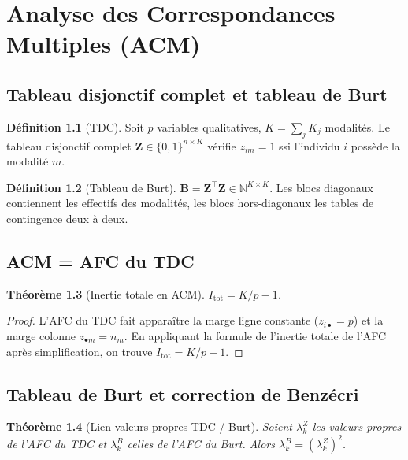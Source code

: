 \documentclass[11pt, a4paper, openany]{book}
\theoremstyle{plain}
\newtheorem{theorem}{Théorème}[chapter]
\theoremstyle{definition}
\newtheorem{definition}[theorem]{Définition}
\theoremstyle{remark}
\newcommand{\N}{\mathbb{N}}
\newcommand{\1}{\mathds{1}}
\newcommand{\Z}{\mathbf{Z}}
\begin{document}
\chapter{Analyse des Correspondances Multiples (ACM)}

\section{Tableau disjonctif complet et tableau de Burt}

\begin{definition}[TDC]
Soit $p$ variables qualitatives, $K = \sum_j K_j$ modalités. Le tableau
disjonctif complet $\Z \in \{0,1\}^{n \times K}$ vérifie $z_{im} = 1$ ssi
l'individu $i$ possède la modalité $m$.
\end{definition}

\begin{definition}[Tableau de Burt]
$\mathbf{B} = \Z^\top \Z \in \N^{K \times K}$. Les blocs diagonaux contiennent
les effectifs des modalités, les blocs hors-diagonaux les tables de contingence
deux à deux.
\end{definition}

\section{ACM = AFC du TDC}

\begin{theorem}[Inertie totale en ACM]
$I_{\text{tot}} = K/p - 1$.
\end{theorem}

\begin{proof}
L'AFC du TDC fait apparaître la marge ligne constante ($z_{i\bullet} = p$) et
la marge colonne $z_{\bullet m} = n_m$. En appliquant la formule de l'inertie
totale de l'AFC après simplification, on trouve $I_{\text{tot}} = K/p - 1$.
\end{proof}

\section{Tableau de Burt et correction de Benzécri}

\begin{theorem}[Lien valeurs propres TDC / Burt]
Soient $\lambda_k^Z$ les valeurs propres de l'AFC du TDC et $\lambda_k^B$
celles de l'AFC du Burt. Alors $\lambda_k^B = (\lambda_k^Z)^2$.
\end{theorem}
\end{document}
